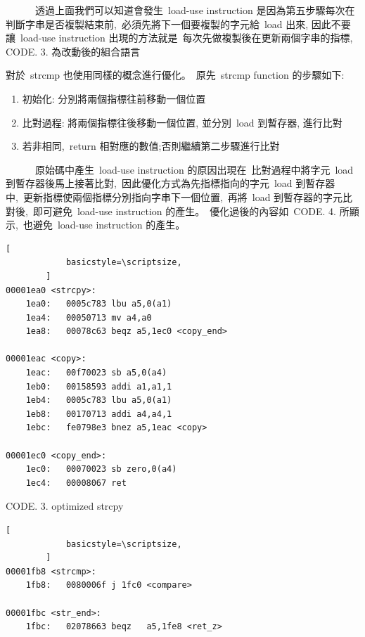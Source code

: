 \documentclass{article}
\begin{document}
\begin{CJK*}{UTF8}{bsmi}
\begin{multicols}{2}
\begin{flushleft}
    \ \ \ \ \ \ 透過上面我們可以知道會發生\ load-use instruction 是因為第五步驟每次在判斷字串是否複製結束前,\
    必須先將下一個要複製的字元給\ load 出來, 因此不要讓\ load-use instruction 出現的方法就是\
    每次先做複製後在更新兩個字串的指標, CODE. 3. 為改動後的組合語言\newline

    對於\ strcmp 也使用同樣的概念進行優化。\ 
    原先\ strcmp function 的步驟如下:\newline
    \begin{enumerate}
        \item 初始化: 分別將兩個指標往前移動一個位置
        \item 比對過程: 將兩個指標往後移動一個位置, 並分別\ load 到暫存器, 進行比對
        \item 若非相同,\ return 相對應的數值;否則繼續第二步驟進行比對\newline
    \end{enumerate}
    \ \ \ \ \ \ 原始碼中產生\ load-use instruction 的原因出現在\ 
    比對過程中將字元\ load 到暫存器後馬上接著比對,\
    因此優化方式為先指標指向的字元\ load 到暫存器中,\ 
    更新指標使兩個指標分別指向字串下一個位置,\
    再將\ load 到暫存器的字元比對後,\
    即可避免\ load-use instruction 的產生。\
    優化過後的內容如\ CODE. 4. 所顯示,\
    也避免\ load-use instruction 的產生。
    
    \begin{center}
        \begin{lstlisting}[
            basicstyle=\scriptsize, 
        ]
00001ea0 <strcpy>:
    1ea0:	0005c783 lbu a5,0(a1)
    1ea4:	00050713 mv	a4,a0
    1ea8:	00078c63 beqz a5,1ec0 <copy_end>

00001eac <copy>:
    1eac:	00f70023 sb	a5,0(a4)
    1eb0:	00158593 addi a1,a1,1
    1eb4:	0005c783 lbu a5,0(a1)
    1eb8:	00170713 addi a4,a4,1
    1ebc:	fe0798e3 bnez a5,1eac <copy>

00001ec0 <copy_end>:
    1ec0:	00070023 sb	zero,0(a4)
    1ec4:	00008067 ret
        \end{lstlisting}
        \small CODE. 3. optimized strcpy
    \end{center}

    \columnbreak

    \begin{center}
        \begin{lstlisting}[
            basicstyle=\scriptsize, 
        ]
00001fb8 <strcmp>:
    1fb8:	0080006f j 1fc0 <compare>

00001fbc <str_end>:
    1fbc:	02078663 beqz	a5,1fe8 <ret_z>


\end{lstlisting}
\end{center}
\end{flushleft}
\end{multicols}
\end{CJK*}
\end{document}
